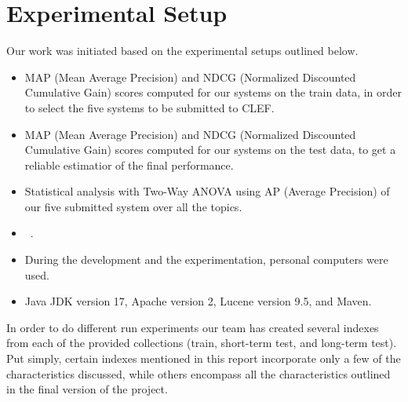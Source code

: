 \section{Experimental Setup}\label{sec:setup}

Our work was initiated based on the experimental setups outlined below.
\begin{itemize}
	\item MAP (Mean Average Precision) and NDCG (Normalized Discounted Cumulative Gain) scores computed for our systems
	on the train data, in order to select the five systems to be submitted to CLEF.
	\item MAP (Mean Average Precision) and NDCG (Normalized Discounted Cumulative Gain) scores computed for our systems
	on the test data, to get a reliable estimatior of the final performance.
	\item Statistical analysis with Two-Way ANOVA using AP (Average Precision) of our five submitted system over all
	the topics.
	\item~\citep[Repository]{jihuming}. %
	\item During the development and the experimentation, personal computers were used.
	\item Java JDK version 17, Apache version 2, Lucene version 9.5, and Maven.
\end{itemize}

In order to do different run experiments our team has created several indexes from each of the provided collections
(train, short-term test, and long-term test).
Put simply, certain indexes mentioned in this report incorporate only a few of the characteristics discussed, while
others encompass all the characteristics outlined in the final version of the project.\\

